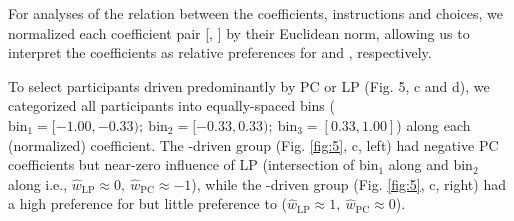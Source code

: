    For analyses of the relation between the coefficients, instructions and choices, we normalized each coefficient pair [{\wPC}, {\wLP}] by their Euclidean norm, allowing us to interpret the coefficients as relative preferences for {\PC} and {\LP}, respectively. 
     
    To select participants driven predominantly by PC or LP (Fig. 5, c and d), we categorized all participants into equally-spaced bins ($\text{bin}_1 = [-1.00, -0.33);\ \text{bin}_2 = [-0.33, 0.33);\ \text{bin}_3 = [0.33, 1.00]$) along each (normalized) coefficient. The {\PC}-driven group (Fig. \ref{fig:5}, c, left) had negative PC coefficients but near-zero influence of LP (intersection of $\text{bin}_1$ along {\PC} and $\text{bin}_2$ along {\LP} i.e., $\hat w_\text{LP} \approx 0,\ \hat w_\text{PC} \approx -1$), while the {\LP}-driven group (Fig. \ref{fig:5}, c, right) had a high preference for {\LP} but little preference to {\PC} ($\hat w_\text{LP} \approx 1,\ \hat w_\text{PC} \approx 0$). 